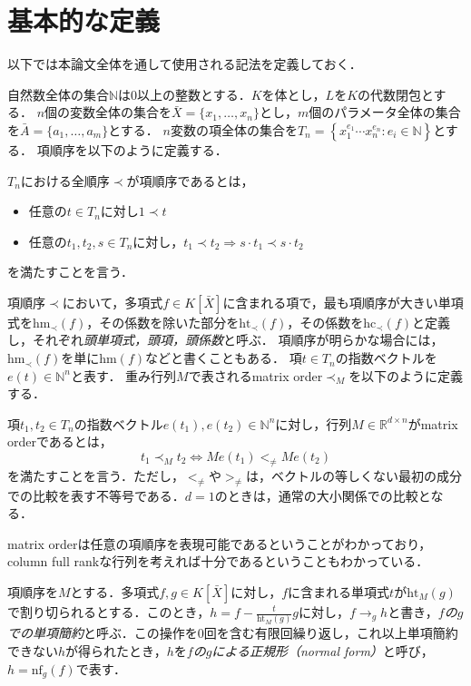 \section{基本的な定義}
以下では本論文全体を通して使用される記法を定義しておく．
\par
自然数全体の集合$\mathbb{N}$は$0$以上の整数とする．$K$を体とし，$L$を$K$の代数閉包とする．
$n$個の変数全体の集合を$\bar{X} = \{x_1, \dots, x_n\}$とし，$m$個のパラメータ全体の集合を$\bar{A} = \{a_1, \dots, a_m\}$とする．
$n$変数の項全体の集合を$T_n = \left\{ x_1^{e_1} \cdots x_n^{e_n} : e_i \in \mathbb{N} \right\}$とする．
項順序を以下のように定義する．
\begin{definition}[項順序]
	$T_n$における全順序$\prec$が項順序であるとは，
	\begin{itemize}
		\item 任意の$t \in T_n$に対し$1 \prec t$
		\item 任意の$t_1, t_2, s \in T_n$に対し，$t_1 \prec t_2 \Longrightarrow s\cdot t_1 \prec s\cdot t_2$
	\end{itemize}
	を満たすことを言う．
\end{definition}
項順序$\prec$において，多項式$f\in K[\bar{X}]$に含まれる項で，最も項順序が大きい単項式を$\mathrm{hm}_{\prec}(f)$，その係数を除いた部分を$\mathrm{ht}_{\prec}(f)$，その係数を$\mathrm{hc}_{\prec}(f)$と定義し，それぞれ\emph{頭単項式，頭項，頭係数}と呼ぶ．
項順序が明らかな場合には，$\mathrm{hm}_{\prec}(f)$を単に$\mathrm{hm}(f)$などと書くこともある．
項$t \in T_n$の指数ベクトルを$e(t) \in \mathbb{N}^{n}$と表す．
重み行列$M$で表されるmatrix order$\prec_M$を以下のように定義する．
\begin{definition}
	項$t_1, t_2 \in T_n$の指数ベクトル$e(t_1), e(t_2) \in \mathbb{N}^{n}$に対し，行列$M \in \mathbb{R}^{d\times n}$がmatrix orderであるとは，
	$$t_1 \prec_M t_2 \Longleftrightarrow Me(t_1) <_{\ne} Me(t_2)$$
	を満たすことを言う．ただし，$<_{\ne}$や$>_{\ne}$は，ベクトルの等しくない最初の成分での比較を表す不等号である．$d=1$のときは，通常の大小関係での比較となる．
\end{definition}
matrix orderは任意の項順序を表現可能である\cite{MR826583}ということがわかっており，column full rankな行列を考えれば十分であるということもわかっている．
\par
項順序を$M$とする．多項式$f, g \in K[\bar{X}]$に対し，$f$に含まれる単項式$t$が$\mathrm{ht}_M(g)$で割り切られるとする．このとき，$h = f - \frac{t}{\mathrm{ht}_M(g)}g$に対し，$f \to_g h$と書き，\emph{$f$の$g$での単項簡約}と呼ぶ．この操作を$0$回を含む有限回繰り返し，これ以上単項簡約できない$h$が得られたとき，$h$を\emph{$f$の$g$による正規形（normal form）}と呼び，$h = \mathrm{nf}_g(f)$で表す．
